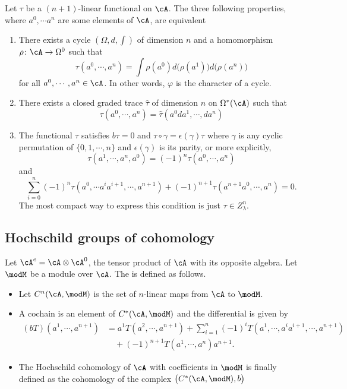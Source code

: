 \begin{proposition}
	Let $\tau$ be a $(n+1)$-linear functional on $\cA$. The three following properties, where $a^0,\cdots a^n$ are some elements of $\cA$, are equivalent
	\begin{enumerate}
		\item There exists a cycle $(\Omega,d,\int)$ of dimension $n$ and a homomorphism $\rho\colon \cA\to \Omega^0$ such that
		      \[
			      \tau(a^0,\cdots,a^{n})=\int \rho(a^0)d\big( \rho(a^1) \big)d\big( \rho(a^{n}) \big)
		      \]
		      for all $a^0,\cdots,a^{n}\in\cA$. In other words, $\varphi$ is the character of a cycle.
		\item There exists a closed graded trace $\hat{\tau}$ of dimension $n$ on $\Omega^*(\cA)$ such that
		      \[
			      \tau(a^0,\cdots,a^{n})=\hat{\tau}(a^0da^1,\cdots,da^{n})
		      \]
		\item The functional $\tau$ satisfies $b\tau=0$ and $\tau\circ\gamma=\epsilon(\gamma)\tau$ where $\gamma$ is any cyclic permutation of $\{ 0,1,\cdots,n \}$ and $\epsilon(\gamma)$ is its parity, or more explicitly,
		      \[
			      \tau(a^1,\cdots,a^{n},a^0)=(-1)^n\tau(a^0,\cdots,a^{n})
		      \]
		      and
		      \[
			      \sum_{i=0}^{n}(-1)^n\tau(a^0,\cdots a^ia^{i+1},\cdots,a^{n+1})+(-1)^{n+1}\tau(a^{n+1}a^0,\cdots,a^{n})=0.
		      \]
		      The most compact way to express this condition is just $\tau\in Z^n_{\lambda}$.
	\end{enumerate}
\end{proposition}

\subsection{Hochschild groups of cohomology}

\begin{definition}
	Let $\cA^e=\cA\otimes\cA^0$, the tensor product of $\cA$ with its opposite algebra. Let $\modM$ be a module over $\cA$. The  is defined as follows.

	\begin{itemize}
		\item
		      Let $C^n(\cA,\modM)$ is the set of $n$-linear maps from $\cA$ to $\modM$.
		\item A cochain is an element of $C^*(\cA,\modM)$ and the differential is given by
		      \begin{equation}
			      \begin{split}
				      (bT)(a^1,\cdots,a^{n+1})&=a^1T(a^2,\cdots,a^{n+1})+\sum_{i=1}^{n}(-1)^iT(a^1,\cdots,a^ia^{i+1},\cdots,a^{n+1})\\
				      &\quad +(-1)^{n+1}T(a^1,\cdots,a^{n})a^{n+1}.
			      \end{split}
		      \end{equation}
		\item
		      The Hochschild cohomology of $\cA$ with coefficients in $\modM$ is finally defined as the cohomology of the complex $\big( C^*(\cA,\modM),b \big)$
	\end{itemize}
\end{definition}

